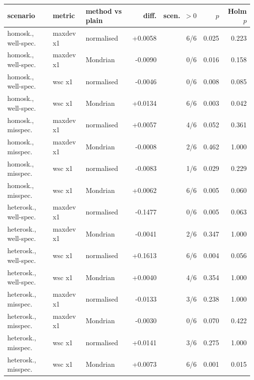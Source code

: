 \begin{tabular}{lllrrrr}
\toprule
scenario & metric & method vs plain & diff. & scen.\ $>0$ & $p$ & Holm $p$ \\
\midrule
homosk., well-spec. & maxdev x1 & normalised & +0.0058 & 6/6 & 0.025 & 0.223 \\
homosk., well-spec. & maxdev x1 & Mondrian & -0.0090 & 0/6 & 0.016 & 0.158 \\
homosk., well-spec. & wsc x1 & normalised & -0.0046 & 0/6 & 0.008 & 0.085 \\
homosk., well-spec. & wsc x1 & Mondrian & +0.0134 & 6/6 & 0.003 & 0.042 \\
homosk., misspec. & maxdev x1 & normalised & +0.0057 & 4/6 & 0.052 & 0.361 \\
homosk., misspec. & maxdev x1 & Mondrian & -0.0008 & 2/6 & 0.462 & 1.000 \\
homosk., misspec. & wsc x1 & normalised & -0.0083 & 1/6 & 0.029 & 0.229 \\
homosk., misspec. & wsc x1 & Mondrian & +0.0062 & 6/6 & 0.005 & 0.060 \\
heterosk., well-spec. & maxdev x1 & normalised & -0.1477 & 0/6 & 0.005 & 0.063 \\
heterosk., well-spec. & maxdev x1 & Mondrian & -0.0041 & 2/6 & 0.347 & 1.000 \\
heterosk., well-spec. & wsc x1 & normalised & +0.1613 & 6/6 & 0.004 & 0.056 \\
heterosk., well-spec. & wsc x1 & Mondrian & +0.0040 & 4/6 & 0.354 & 1.000 \\
heterosk., misspec. & maxdev x1 & normalised & -0.0133 & 3/6 & 0.238 & 1.000 \\
heterosk., misspec. & maxdev x1 & Mondrian & -0.0030 & 0/6 & 0.070 & 0.422 \\
heterosk., misspec. & wsc x1 & normalised & +0.0141 & 3/6 & 0.275 & 1.000 \\
heterosk., misspec. & wsc x1 & Mondrian & +0.0073 & 6/6 & 0.001 & 0.015 \\
\bottomrule
\end{tabular}
